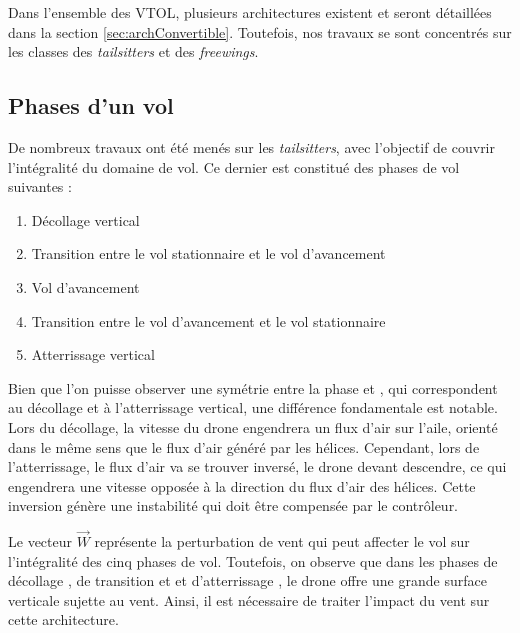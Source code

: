Dans l'ensemble des VTOL, plusieurs architectures existent et seront détaillées dans la section \ref{sec:archConvertible}. Toutefois, nos travaux se sont concentrés sur les classes des \textit{tailsitters} et des \textit{freewings}.

\subsection*{Phases d'un vol}
De nombreux travaux ont été menés sur les \textit{tailsitters}, avec l'objectif de couvrir l'intégralité du domaine de vol. Ce dernier est constitué des phases de vol suivantes :
\begin{enumerate}
    \item Décollage vertical
    \item Transition entre le vol stationnaire et le vol d'avancement
    \item Vol d'avancement
    \item Transition entre le vol d'avancement et le vol stationnaire
    \item Atterrissage vertical
\end{enumerate}


Bien que l'on puisse observer une symétrie entre la phase  et , qui correspondent au décollage et à l'atterrissage vertical, une différence fondamentale est notable. Lors du décollage, la vitesse du drone engendrera un flux d'air sur l'aile, orienté dans le même sens que le flux d'air généré par les hélices. Cependant, lors de l'atterrissage, le flux d'air va se trouver inversé, le drone devant descendre, ce qui engendrera une vitesse opposée à la direction du flux d'air des hélices. Cette inversion génère une instabilité qui doit être compensée par le contrôleur.

Le vecteur $\overrightarrow{W}$ représente la perturbation de vent qui peut affecter le vol sur l'intégralité des cinq phases de vol. Toutefois, on observe que dans les phases de décollage , de transition  et  et d'atterrissage , le drone offre une grande surface verticale sujette au vent. Ainsi, il est nécessaire de traiter l'impact du vent sur cette architecture.

